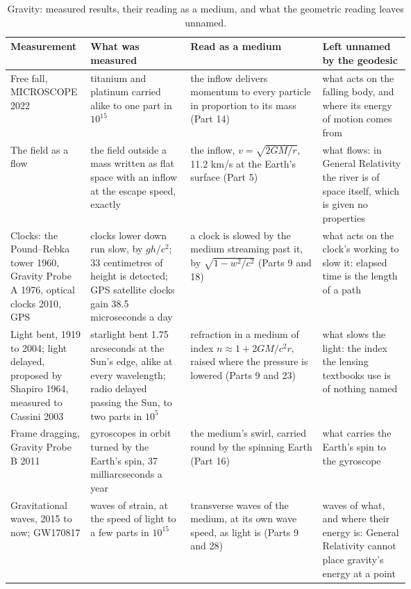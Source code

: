 \begin{table}[p]\centering\footnotesize
\caption{Gravity: measured results, their reading as a medium, and what the geometric reading leaves unnamed.}
\renewcommand{\arraystretch}{1.08}\begin{tabularx}{\linewidth}{@{}>{\raggedright\arraybackslash}p{0.2\linewidth} >{\raggedright\arraybackslash}p{0.25\linewidth} >{\raggedright\arraybackslash}X >{\raggedright\arraybackslash}p{0.22\linewidth}@{}}\toprule
\textbf{Measurement} & \textbf{What was measured} & \textbf{Read as a medium} & \textbf{Left unnamed by the geodesic}\\\midrule
Free fall, MICROSCOPE 2022 & titanium and platinum carried alike to one part in $10^{15}$ & the inflow delivers momentum to every particle in proportion to its mass (Part 14) & what acts on the falling body, and where its energy of motion comes from\\
The field as a flow & the field outside a mass written as flat space with an inflow at the escape speed, exactly & the inflow, $v=\sqrt{2GM/r}$, 11.2 km/s at the Earth's surface (Part 5) & what flows: in General Relativity the river is of space itself, which is given no properties\\
Clocks: the Pound--Rebka tower 1960, Gravity Probe A 1976, optical clocks 2010, GPS & clocks lower down run slow, by $gh/c^2$; 33 centimetres of height is detected; GPS satellite clocks gain 38.5 microseconds a day & a clock is slowed by the medium streaming past it, by $\sqrt{1-w^2/c^2}$ (Parts 9 and 18) & what acts on the clock's working to slow it: elapsed time is the length of a path\\
Light bent, 1919 to 2004; light delayed, proposed by Shapiro 1964, measured to Cassini 2003 & starlight bent 1.75 arcseconds at the Sun's edge, alike at every wavelength; radio delayed passing the Sun, to two parts in $10^{5}$ & refraction in a medium of index $n\approx1+2GM/c^2r$, raised where the pressure is lowered (Parts 9 and 23) & what slows the light: the index the lensing textbooks use is of nothing named\\
Frame dragging, Gravity Probe B 2011 & gyroscopes in orbit turned by the Earth's spin, 37 milliarcseconds a year & the medium's swirl, carried round by the spinning Earth (Part 16) & what carries the Earth's spin to the gyroscope\\
Gravitational waves, 2015 to now; GW170817 & waves of strain, at the speed of light to a few parts in $10^{15}$ & transverse waves of the medium, at its own wave speed, as light is (Parts 9 and 28) & waves of what, and where their energy is: General Relativity cannot place gravity's energy at a point\\

\end{tabularx}
\end{table}
